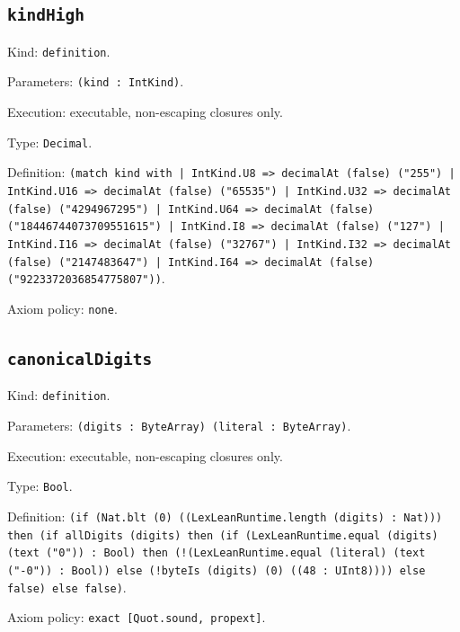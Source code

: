 \documentclass[11pt]{article}
\begin{document}
\subsection*{\texttt{kindHigh}}
\noindent Kind: \texttt{definition}.\par
\noindent Parameters: \texttt{(kind : IntKind)}.\par
\noindent Execution: executable, non-escaping closures only.\par
\noindent Type: \texttt{Decimal}.\par
\noindent Definition: \texttt{(match kind with | IntKind.U8 => decimalAt (false) ("255") | IntKind.U16 => decimalAt (false) ("65535") | IntKind.U32 => decimalAt (false) ("4294967295") | IntKind.U64 => decimalAt (false) ("18446744073709551615") | IntKind.I8 => decimalAt (false) ("127") | IntKind.I16 => decimalAt (false) ("32767") | IntKind.I32 => decimalAt (false) ("2147483647") | IntKind.I64 => decimalAt (false) ("9223372036854775807"))}.\par
\noindent Axiom policy: \texttt{none}.\par
\subsection*{\texttt{canonicalDigits}}
\noindent Kind: \texttt{definition}.\par
\noindent Parameters: \texttt{(digits : ByteArray) (literal : ByteArray)}.\par
\noindent Execution: executable, non-escaping closures only.\par
\noindent Type: \texttt{Bool}.\par
\noindent Definition: \texttt{(if (Nat.blt (0) ((LexLeanRuntime.length (digits) : Nat))) then (if allDigits (digits) then (if (LexLeanRuntime.equal (digits) (text ("0")) : Bool) then (!(LexLeanRuntime.equal (literal) (text ("-0")) : Bool)) else (!byteIs (digits) (0) ((48 : UInt8)))) else false) else false)}.\par
\noindent Axiom policy: \texttt{exact [Quot.sound, propext]}.\par
\end{document}
